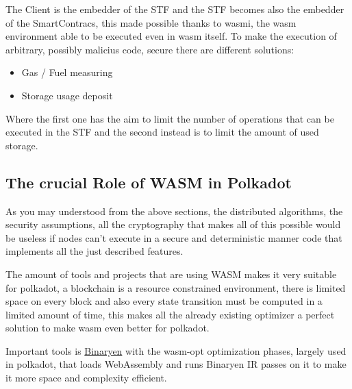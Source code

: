 \documentclass[../main.tex]{subfiles}
\begin{document}
The Client is the embedder of the STF and the STF becomes also the embedder of the SmartContracs, this made possible thanks to wasmi, the wasm environment able to be executed even in wasm itself. To make the execution of arbitrary, possibly malicius code, secure there are different solutions:

\begin{itemize}
  \item Gas / Fuel measuring
  \item Storage usage deposit
\end{itemize}

Where the first one has the aim to limit the number of operations that can be executed in the STF and the second instead is to limit the amount of used storage.

\subsection{The crucial Role of WASM in Polkadot}

As you may understood from the above sections, the distributed algorithms, the security assumptions, all the cryptography that makes all of this possible would be useless if nodes can't execute in a secure and deterministic manner code that implements all the just described features.

The amount of tools and projects that are using WASM makes it very suitable for polkadot, a blockchain is a resource constrained environment, there is limited space on every block and also every state transition must be computed in a limited amount of time, this makes all the already existing optimizer a perfect solution to make wasm even better for polkadot.

Important tools is \href{https://github.com/WebAssembly/binaryen}{Binaryen} with the wasm-opt optimization phases, largely used in polkadot, that loads WebAssembly and runs Binaryen IR passes on it to make it more space and complexity efficient.

\end{document}
